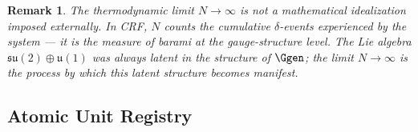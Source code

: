 \documentclass[12pt, a4paper]{article}
\newtheorem{remark}{Remark}[section]
\begin{document}
\begin{remark}
The thermodynamic limit $N\to\infty$ is not a mathematical idealization
imposed externally.
In CRF, $N$ counts the cumulative $\delta$-events experienced by the system —
it is the measure of \emph{barami} at the gauge-structure level.
The Lie algebra $\mathfrak{su}(2)\oplus\mathfrak{u}(1)$ was always latent
in the structure of $\Ggen$; the limit $N\to\infty$ is the process by which
this latent structure becomes manifest.
\end{remark}

\subsection{Atomic Unit Registry}
\label{zc21:sec:registry}
\end{document}
